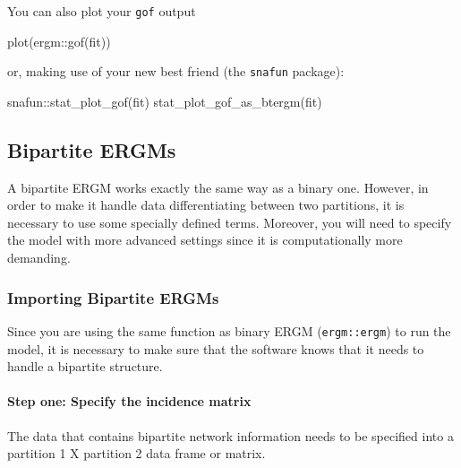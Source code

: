 \documentclass[
]{article}
\newenvironment{Shaded}{\begin{snugshade}}{\end{snugshade}}
\newcommand{\FunctionTok}[1]{\textcolor[rgb]{0.00,0.00,0.00}{#1}}
\newcommand{\NormalTok}[1]{#1}
\newcommand{\SpecialCharTok}[1]{\textcolor[rgb]{0.00,0.00,0.00}{#1}}
\begin{document}
You can also plot your \texttt{gof} output

\begin{Shaded}
\begin{Highlighting}[]
\FunctionTok{plot}\NormalTok{(ergm}\SpecialCharTok{::}\FunctionTok{gof}\NormalTok{(fit))}
\end{Highlighting}
\end{Shaded}

or, making use of your new best friend (the \texttt{snafun} package):

\begin{Shaded}
\begin{Highlighting}[]
\NormalTok{snafun}\SpecialCharTok{::}\FunctionTok{stat\_plot\_gof}\NormalTok{(fit)}
\FunctionTok{stat\_plot\_gof\_as\_btergm}\NormalTok{(fit)}
\end{Highlighting}
\end{Shaded}

\hypertarget{bipartite-ergms}{%
\subsection{Bipartite ERGMs}\label{bipartite-ergms}}

A bipartite ERGM works exactly the same way as a binary one. However, in
order to make it handle data differentiating between two partitions, it
is necessary to use some specially defined terms. Moreover, you will
need to specify the model with more advanced settings since it is
computationally more demanding.

\hypertarget{importing-bipartite-ergms}{%
\subsubsection{Importing Bipartite
ERGMs}\label{importing-bipartite-ergms}}

Since you are using the same function as binary ERGM
(\texttt{ergm::ergm}) to run the model, it is necessary to make sure
that the software knows that it needs to handle a bipartite structure.

\hypertarget{step-one-specify-the-incidence-matrix}{%
\paragraph{Step one: Specify the incidence
matrix}\label{step-one-specify-the-incidence-matrix}}

The data that contains bipartite network information needs to be
specified into a partition 1 X partition 2 data frame or matrix.
\end{document}
